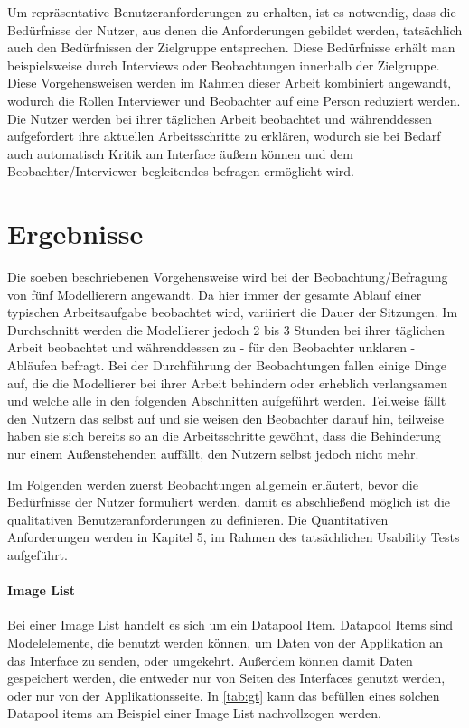 Um repräsentative Benutzeranforderungen zu erhalten, ist es notwendig, dass die Bedürfnisse der Nutzer, aus denen die Anforderungen gebildet werden, tatsächlich auch den Bedürfnissen der Zielgruppe entsprechen.
Diese Bedürfnisse erhält man beispielsweise durch Interviews oder Beobachtungen innerhalb der Zielgruppe.
Diese Vorgehensweisen werden im Rahmen dieser Arbeit kombiniert angewandt, wodurch die Rollen Interviewer und Beobachter auf eine Person reduziert werden.
Die Nutzer werden bei ihrer täglichen Arbeit beobachtet und währenddessen aufgefordert ihre aktuellen Arbeitsschritte zu erklären, wodurch sie bei Bedarf auch automatisch Kritik am Interface äußern können und dem Beobachter/Interviewer begleitendes befragen ermöglicht wird.

\section{Ergebnisse}
Die soeben beschriebenen Vorgehensweise wird bei der Beobachtung/Befragung von fünf Modellierern angewandt.
Da hier immer der gesamte Ablauf einer typischen Arbeitsaufgabe beobachtet wird, variiriert die Dauer der Sitzungen.
Im Durchschnitt werden die Modellierer jedoch 2 bis 3 Stunden bei ihrer täglichen Arbeit beobachtet und währenddessen zu - für den Beobachter unklaren - Abläufen befragt.
Bei der Durchführung der Beobachtungen fallen einige Dinge auf, die die Modellierer bei ihrer Arbeit behindern oder erheblich verlangsamen und welche alle in den folgenden Abschnitten aufgeführt werden.
Teilweise fällt den Nutzern das selbst auf und sie weisen den Beobachter darauf hin, teilweise haben sie sich bereits so an die Arbeitsschritte gewöhnt, dass die Behinderung nur einem Außenstehenden auffällt, den Nutzern selbst jedoch nicht mehr.

Im Folgenden werden zuerst Beobachtungen allgemein erläutert, bevor die Bedürfnisse der Nutzer formuliert werden, damit es abschließend möglich ist die qualitativen Benutzeranforderungen zu definieren.
Die Quantitativen Anforderungen werden in Kapitel 5, im Rahmen des tatsächlichen Usability Tests aufgeführt.

\paragraph{Image List}
Bei einer Image List handelt es sich um ein Datapool Item. 
Datapool Items sind Modelelemente, die benutzt werden können, um Daten von der Applikation an das Interface zu senden, oder umgekehrt.
Außerdem können damit Daten gespeichert werden, die entweder nur von Seiten des Interfaces genutzt werden, oder nur von der Applikationsseite\cite{studio_guide}.
In \cref{tab:gt} kann das befüllen eines solchen Datapool items am Beispiel einer Image List nachvollzogen werden.

